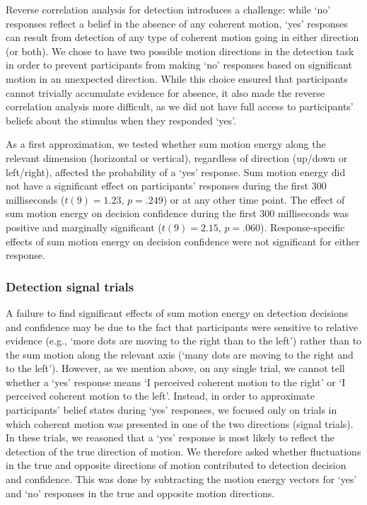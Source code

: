 \documentclass[12pt,twoside]{reedthesis}
\begin{document}
Reverse correlation analysis for detection introduces a challenge: while `no' responses reflect a belief in the absence of any coherent motion, `yes' responses can result from detection of any type of coherent motion going in either direction (or both). We chose to have two possible motion directions in the detection task in order to prevent participants from making `no' responses based on significant motion in an unexpected direction. While this choice ensured that participants cannot trivially accumulate evidence for absence, it also made the reverse correlation analysis more difficult, as we did not have full access to participants' beliefs about the stimulus when they responded `yes'.

As a first approximation, we tested whether sum motion energy along the relevant dimension (horizontal or vertical), regardless of direction (up/down or left/right), affected the probability of a `yes' response. Sum motion energy did not have a significant effect on participants' responses during the first 300 milliseconds (\(t(9) = 1.23\), \(p = .249\)) or at any other time point. The effect of sum motion energy on decision confidence during the first 300 milliseconds was positive and marginally significant (\(t(9) = 2.15\), \(p = .060\)). Response-specific effects of sum motion energy on decision confidence were not significant for either response.

\hypertarget{detection-signal-trials}{%
\subsubsection*{Detection signal trials}\label{detection-signal-trials}}

A failure to find significant effects of sum motion energy on detection decisions and confidence may be due to the fact that participants were sensitive to relative evidence (e.g., `more dots are moving to the right than to the left') rather than to the sum motion along the relevant axis (`many dots are moving to the right and to the left'). However, as we mention above, on any single trial, we cannot tell whether a `yes' response means `I perceived coherent motion to the right' or `I perceived coherent motion to the left'. Instead, in order to approximate participants' belief states during `yes' responses, we focused only on trials in which coherent motion was presented in one of the two directions (signal trials). In these trials, we reasoned that a `yes' response is most likely to reflect the detection of the true direction of motion. We therefore asked whether fluctuations in the true and opposite directions of motion contributed to detection decision and confidence. This was done by subtracting the motion energy vectors for `yes' and `no' responses in the true and opposite motion directions.
\end{document}
